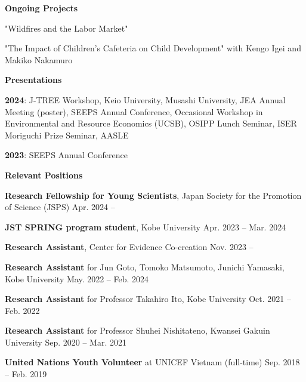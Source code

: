 \documentclass{article}
\begin{document}
\begin{flushleft}
  \textbf{\large{Ongoing Projects}}
\end{flushleft}

"Wildfires and the Labor Market"

"The Impact of Children's Cafeteria on Child Development" with Kengo Igei and Makiko Nakamuro

\hrulefill

\begin{flushleft}
  \textbf{\large{Presentations}}
\end{flushleft}

\textbf{2024}: J-TREE Workshop, Keio University, Musashi University, JEA Annual Meeting (poster), SEEPS Annual Conference, Occasional Workshop in Environmental and Resource Economics (UCSB), OSIPP Lunch Seminar, ISER Moriguchi Prize Seminar, AASLE

\textbf{2023}: SEEPS Annual Conference

\hrulefill

\begin{flushleft}
  \textbf{\large{Relevant Positions}}
\end{flushleft}

\textbf{Research Fellowship for Young Scientists}, Japan Society for the Promotion of Science (JSPS) \hspace{\fill} Apr. 2024 --

\textbf{JST SPRING program student}, Kobe University \hspace{\fill} Apr. 2023 -- Mar. 2024

\textbf{Research Assistant}, Center for Evidence Co-creation \hspace{\fill} Nov. 2023 --

\textbf{Research Assistant} for Jun Goto, Tomoko Matsumoto, Junichi Yamasaki, Kobe University \hspace{\fill} May. 2022 -- Feb. 2024

\textbf{Research Assistant} for Professor Takahiro Ito, Kobe University \hspace{\fill} Oct. 2021 -- Feb. 2022

\textbf{Research Assistant} for Professor Shuhei Nishitateno, Kwansei Gakuin University \hspace{\fill} Sep. 2020 -- Mar. 2021

\textbf{United Nations Youth Volunteer} at UNICEF Vietnam (full-time) \hspace{\fill} Sep. 2018 -- Feb. 2019
\end{document}
